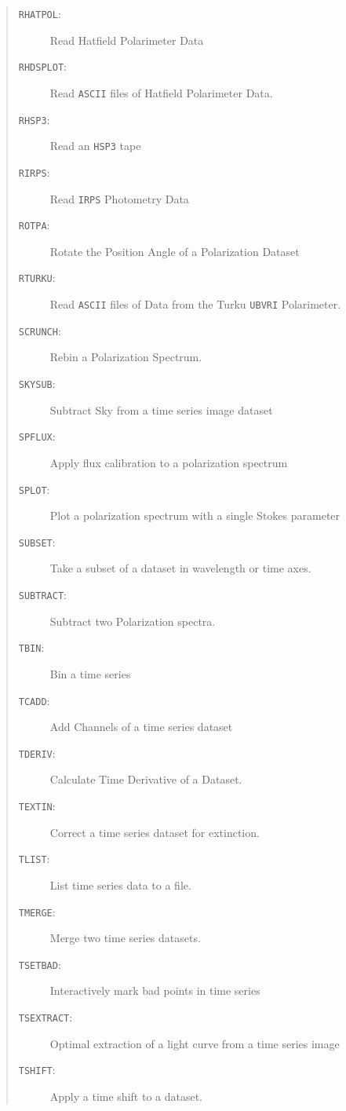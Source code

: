 \documentclass[11pt,twoside]{article}
\renewcommand{\_}{\texttt{\symbol{95}}}
\newenvironment{mansectionroutines}{\begin{quote}\begin{description}}%
{\end{description}\end{quote}}
\newcommand{\mansectionitem}[1]{\item[#1:]\mbox{}}
\newcommand{\mantt}{\tt}
\begin{document}
\begin{mansectionroutines}
\mansectionitem{{\mantt{RHATPOL}}}
        Read Hatfield Polarimeter Data

\mansectionitem{{\mantt{RHDSPLOT}}}
        Read {\mantt{ASCII}} files of Hatfield Polarimeter Data.

\mansectionitem{{\mantt{RHSP3}}}
        Read an {\mantt{HSP3}} tape

\mansectionitem{{\mantt{RIRPS}}}
        Read {\mantt{IRPS}} Photometry Data

\mansectionitem{{\mantt{ROTPA}}}
        Rotate the Position Angle of a Polarization Dataset

\mansectionitem{{\mantt{RTURKU}}}
        Read {\mantt{ASCII}} files of Data from the Turku {\mantt{UBVRI}} %
Polarimeter.

\mansectionitem{{\mantt{SCRUNCH}}}
        Rebin a Polarization Spectrum.

\mansectionitem{{\mantt{SKYSUB}}}
        Subtract Sky from a time series image dataset

\mansectionitem{{\mantt{SPFLUX}}}
        Apply flux calibration to a polarization spectrum

\mansectionitem{{\mantt{SPLOT}}}
        Plot a polarization spectrum with a single Stokes parameter

\mansectionitem{{\mantt{SUBSET}}}
        Take a subset of a dataset in wavelength or time axes.

\mansectionitem{{\mantt{SUBTRACT}}}
        Subtract two Polarization spectra.

\mansectionitem{{\mantt{TBIN}}}
        Bin a time series

\mansectionitem{{\mantt{TCADD}}}
        Add Channels of a time series dataset

\mansectionitem{{\mantt{TDERIV}}}
        Calculate Time Derivative of a Dataset.

\mansectionitem{{\mantt{TEXTIN}}}
        Correct a time series dataset for extinction.

\mansectionitem{{\mantt{TLIST}}}
        List time series data to a file.

\mansectionitem{{\mantt{TMERGE}}}
        Merge two time series datasets.

\mansectionitem{{\mantt{TSETBAD}}}
        Interactively mark bad points in time series

\mansectionitem{{\mantt{TSEXTRACT}}}
        Optimal extraction of a light curve from a time series image

\mansectionitem{{\mantt{TSHIFT}}}
        Apply a time shift to a dataset.


\end{mansectionroutines}
\end{document}
